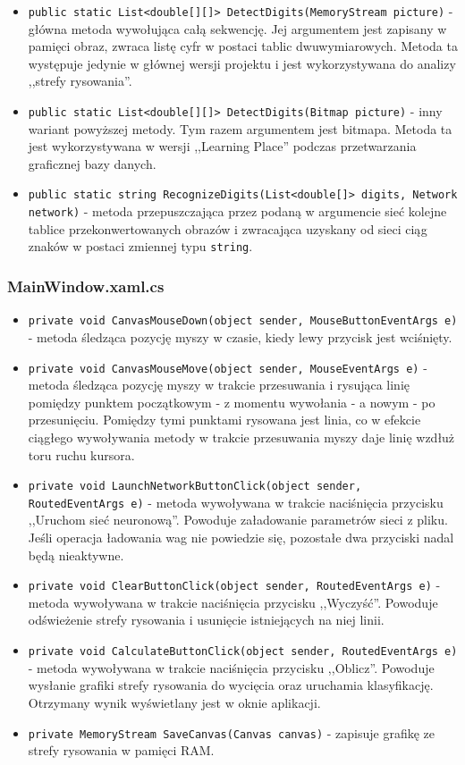 \documentclass[12pt,a4paper]{article}
\begin{document}
\begin{itemize}
	    \item \lstinline{public static List<double[][]> DetectDigits(MemoryStream picture)} - główna metoda wywołująca całą sekwencję. Jej argumentem jest zapisany w pamięci obraz, zwraca listę cyfr w postaci tablic dwuwymiarowych. Metoda ta występuje jedynie w głównej wersji projektu i jest wykorzystywana do analizy ,,strefy rysowania''.
	    \item \lstinline{public static List<double[][]> DetectDigits(Bitmap picture)} - inny wariant powyższej metody. Tym razem argumentem jest bitmapa. Metoda ta jest wykorzystywana w wersji ,,Learning Place'' podczas przetwarzania graficznej bazy danych.
	    \item \lstinline{public static string RecognizeDigits(List<double[]> digits, Network network)} - metoda przepuszczająca przez podaną w argumencie sieć kolejne tablice przekonwertowanych obrazów i zwracająca uzyskany od sieci ciąg znaków w postaci zmiennej typu \lstinline{string}.
	\end{itemize}

	\subsubsection*{MainWindow.xaml.cs}
    \begin{itemize}
        \item \lstinline{private void CanvasMouseDown(object sender, MouseButtonEventArgs e)} - metoda śledząca pozycję myszy w czasie, kiedy lewy przycisk jest wciśnięty.
        \item \lstinline{private void CanvasMouseMove(object sender, MouseEventArgs e)} - metoda śledząca pozycję myszy w trakcie przesuwania i rysująca linię pomiędzy punktem początkowym - z momentu wywołania - a nowym - po przesunięciu. Pomiędzy tymi punktami rysowana jest linia, co w efekcie ciągłego wywoływania metody w trakcie przesuwania myszy daje linię wzdłuż toru ruchu kursora.
        \item \lstinline{private void LaunchNetworkButtonClick(object sender, RoutedEventArgs e)} - metoda wywoływana w trakcie naciśnięcia przycisku ,,Uruchom sieć neuronową''. Powoduje załadowanie parametrów sieci z pliku. Jeśli operacja ładowania wag nie powiedzie się, pozostałe dwa przyciski nadal będą nieaktywne.
        \item \lstinline{private void ClearButtonClick(object sender, RoutedEventArgs e)} - metoda wywoływana w trakcie naciśnięcia przycisku ,,Wyczyść''. Powoduje odświeżenie strefy rysowania i usunięcie istniejących na niej linii.
        \item \lstinline{private void CalculateButtonClick(object sender, RoutedEventArgs e)} - metoda wywoływana w trakcie naciśnięcia przycisku ,,Oblicz''. Powoduje wysłanie grafiki strefy rysowania do wycięcia oraz uruchamia klasyfikację. Otrzymany wynik wyświetlany jest w oknie aplikacji.
        \item \lstinline{private MemoryStream SaveCanvas(Canvas canvas)} - zapisuje grafikę ze strefy rysowania w pamięci RAM.
    \end{itemize}
\end{document}
